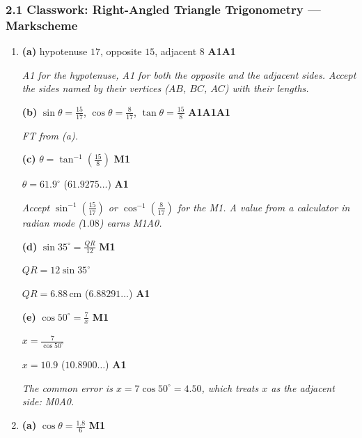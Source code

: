 \documentclass[12pt, twoside]{article}
\begin{document}
\subsubsection*{2.1 Classwork: Right-Angled Triangle Trigonometry --- Markscheme}

\begin{enumerate}[itemsep=0.3cm]

\item[1.] [Maximum mark: 11]

\textbf{(a)} hypotenuse $17$, opposite $15$, adjacent $8$ \hfill \textbf{A1A1}

\emph{A1 for the hypotenuse, A1 for both the opposite and the adjacent
sides. Accept the sides named by their vertices ($AB$, $BC$, $AC$) with
their lengths.}

\textbf{(b)} $\sin\theta = \frac{15}{17}$, \quad $\cos\theta = \frac{8}{17}$,
\quad $\tan\theta = \frac{15}{8}$ \hfill \textbf{A1A1A1}

\emph{FT from (a).}

\textbf{(c)} $\theta = \tan^{-1}\left(\frac{15}{8}\right)$ \hfill \textbf{M1}

$\theta = 61.9^\circ$ \quad ($61.9275\ldots$) \hfill \textbf{A1}

\emph{Accept $\sin^{-1}\left(\frac{15}{17}\right)$ or
$\cos^{-1}\left(\frac{8}{17}\right)$ for the M1. A value from a calculator
in radian mode ($1.08$) earns M1A0.}

\textbf{(d)} $\sin 35^\circ = \frac{QR}{12}$ \hfill \textbf{M1}

$QR = 12 \sin 35^\circ$

$QR = 6.88\,\text{cm}$ \quad ($6.88291\ldots$) \hfill \textbf{A1}

\textbf{(e)} $\cos 50^\circ = \frac{7}{x}$ \hfill \textbf{M1}

$x = \frac{7}{\cos 50^\circ}$

$x = 10.9$ \quad ($10.8900\ldots$) \hfill \textbf{A1}

\emph{The common error is $x = 7\cos 50^\circ = 4.50$, which treats $x$ as
the adjacent side: M0A0.}

\newpage

\item[2.] [Maximum mark: 10]

\begin{minipage}[t]{0.68\linewidth}
\vspace{0pt}
\setlength{\parskip}{0.5\baselineskip}
\textbf{(a)} $\cos\theta = \frac{1.8}{6}$ \hfill \textbf{M1}


\end{minipage}
\end{enumerate}
\end{document}
